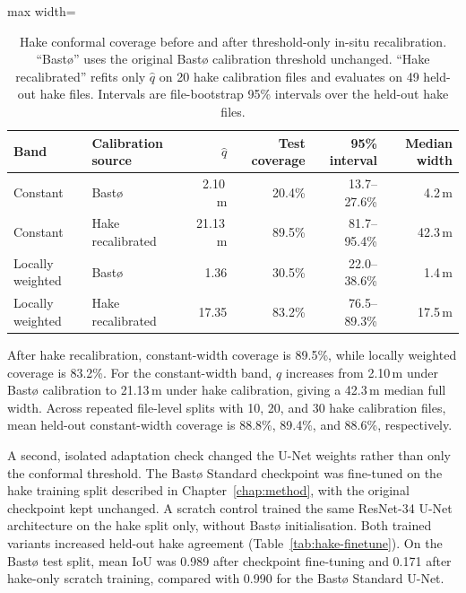 \begin{table}[htbp]
\centering
\caption[Hake conformal recalibration]{Hake conformal coverage before and after threshold-only in-situ recalibration. ``Bast\o{}'' uses the original Bast\o{} calibration threshold unchanged. ``Hake recalibrated'' refits only $\hat q$ on 20 hake calibration files and evaluates on 49 held-out hake files. Intervals are file-bootstrap 95\% intervals over the held-out hake files.}
\label{tab:hake-recalibration}
\small
\begin{adjustbox}{max width=\textwidth}
\begin{tabular}{l l r r r r}
\toprule
Band & Calibration source & $\hat q$ & Test coverage & 95\% interval & Median width \\
\midrule
Constant & Bast\o{} & 2.10\,m & 20.4\% & 13.7--27.6\% & 4.2\,m \\
Constant & Hake recalibrated & 21.13\,m & 89.5\% & 81.7--95.4\% & 42.3\,m \\
Locally weighted & Bast\o{} & 1.36 & 30.5\% & 22.0--38.6\% & 1.4\,m \\
Locally weighted & Hake recalibrated & 17.35 & 83.2\% & 76.5--89.3\% & 17.5\,m \\
\bottomrule
\end{tabular}
\end{adjustbox}
\end{table}

After hake recalibration, constant-width coverage is 89.5\%, while locally weighted coverage is 83.2\%. For the constant-width band, $\hat q$ increases from 2.10\,m under Bast\o{} calibration to 21.13\,m under hake calibration, giving a 42.3\,m median full width. Across repeated file-level splits with 10, 20, and 30 hake calibration files, mean held-out constant-width coverage is 88.8\%, 89.4\%, and 88.6\%, respectively.

A second, isolated adaptation check changed the U-Net weights rather than only the conformal threshold. The Bast\o{} Standard checkpoint was fine-tuned on the hake training split described in Chapter~\ref{chap:method}, with the original checkpoint kept unchanged. A scratch control trained the same ResNet-34 U-Net architecture on the hake split only, without Bast\o{} initialisation. Both trained variants increased held-out hake agreement (Table~\ref{tab:hake-finetune}). On the Bast\o{} test split, mean IoU was 0.989 after checkpoint fine-tuning and 0.171 after hake-only scratch training, compared with 0.990 for the Bast\o{} Standard U-Net.

